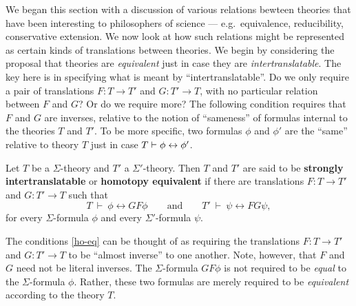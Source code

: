 




We began this section with a discussion of various relations bewteen
theories that have been interesting to philosophers of science ---
e.g.\ equivalence, reducibility, conservative extension.  We now look
at how such relations might be represented as certain kinds of
translations between theories.  We begin by considering the proposal
that theories are \emph{equivalent} just in case they are
\emph{intertranslatable}.  The key here is in specifying what is meant
by ``intertranslatable''.  Do we only require a pair of translations
$F:T\to T'$ and $G:T'\to T$, with no particular relation between $F$
and $G$?  Or do we require more?  The following condition requires
that $F$ and $G$ are inverses, relative to the notion of ``sameness''
of formulas internal to the theories $T$ and $T'$.  To be more
specific, two formulas $\phi$ and $\phi '$ are the ``same'' relative
to theory $T$ just in case $T\vdash \phi\leftrightarrow\phi '$.

\begin{defn} \label{def:itrans} Let $T$ be a $\Sigma$-theory and $T'$
  a $\Sigma '$-theory.  Then $T$ and $T'$ are said to be
  \textbf{strongly intertranslatable} or \textbf{homotopy equivalent}
  if there are translations $F:T\rightarrow T'$ and
  $G:T'\rightarrow T$ such that
  \begin{equation} T\:\vdash\: \phi \leftrightarrow GF\phi \qquad
    \text{and} \qquad T'\:\vdash\: \psi \leftrightarrow FG\psi
    , \label{ho-eq}
\end{equation}
for every $\Sigma$-formula $\phi$ and every $\Sigma '$-formula $\psi$.
\end{defn}
The conditions \eqref{ho-eq} can be thought of as requiring the
translations $F:T\rightarrow T'$ and $G:T'\rightarrow T$ to be
``almost inverse'' to one another. Note, however, that $F$ and $G$
need not be literal inverses. The $\Sigma$-formula $GF\phi$ is not
required to be \textit{equal} to the $\Sigma$-formula $\phi$. Rather,
these two formulas are merely required to be \textit{equivalent}
according to the theory $T$.

